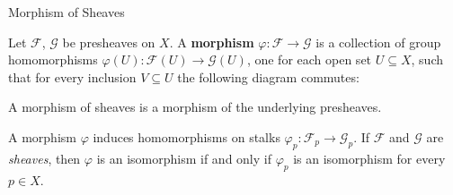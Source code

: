 \documentclass[10pt,aspectratio=1610]{beamer}
\newcommand{\FF}{\mathcal{F}}
\newcommand{\GG}{\mathcal{G}}
\begin{document}
    \begin{frame}[fragile]{Morphism of Sheaves}
        \begin{definition}
            Let $\FF$, $\GG$ be presheaves on $X$. A \textbf{morphism} $\varphi \colon \FF \to \GG$ is a collection of group homomorphisms $\varphi(U) \colon \FF(U) \to \GG(U)$, one for each open set $U \subseteq X$, such that for every inclusion $V \subseteq U$ the following diagram commutes:
            \begin{center}
            \end{center}
            A morphism of sheaves is a morphism of the underlying presheaves.
        \end{definition}
        \begin{theorem}
            A morphism $\varphi$ induces homomorphisms on stalks $\varphi_p \colon \FF_p \to \GG_p$. If $\FF$ and $\GG$ are \emph{sheaves}, then $\varphi$ is an isomorphism if and only if $\varphi_p$ is an isomorphism for every $p \in X$.
        \end{theorem}
    \end{frame}
\end{document}
